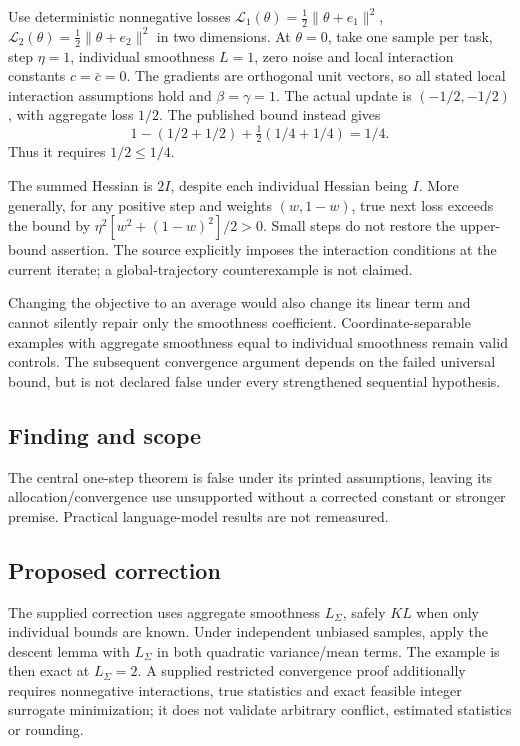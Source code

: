 \documentclass[11pt]{article}
\begin{document}
Use deterministic nonnegative losses \(\mathcal L_1(\theta)=\tfrac12\|\theta+e_1\|^2\), \(\mathcal L_2(\theta)=\tfrac12\|\theta+e_2\|^2\) in two dimensions. At \(\theta=0\), take one sample per task, step \(\eta=1\), individual smoothness \(L=1\), zero noise and local interaction constants \(c=\bar c=0\). The gradients are orthogonal unit vectors, so all stated local interaction assumptions hold and \(\beta=\gamma=1\). The actual update is \((-1/2,-1/2)\), with aggregate loss \(1/2\). The published bound instead gives \[1-(1/2+1/2)+\tfrac12(1/4+1/4)=1/4.\] Thus it requires \(1/2\leq1/4\).

The summed Hessian is \(2I\), despite each individual Hessian being \(I\). More generally, for any positive step and weights \((w,1-w)\), true next loss exceeds the bound by \(\eta^2[w^2+(1-w)^2]/2>0\). Small steps do not restore the upper-bound assertion. The source explicitly imposes the interaction conditions at the current iterate; a global-trajectory counterexample is not claimed.

Changing the objective to an average would also change its linear term and cannot silently repair only the smoothness coefficient. Coordinate-separable examples with aggregate smoothness equal to individual smoothness remain valid controls. The subsequent convergence argument depends on the failed universal bound, but is not declared false under every strengthened sequential hypothesis.

\subsection*{Finding and scope}

The central one-step theorem is false under its printed assumptions, leaving its allocation/convergence use unsupported without a corrected constant or stronger premise. Practical language-model results are not remeasured.

\subsection*{Proposed correction}

The supplied correction uses aggregate smoothness \(L_\Sigma\), safely \(KL\) when only individual bounds are known. Under independent unbiased samples, apply the descent lemma with \(L_\Sigma\) in both quadratic variance/mean terms. The example is then exact at \(L_\Sigma=2\). A supplied restricted convergence proof additionally requires nonnegative interactions, true statistics and exact feasible integer surrogate minimization; it does not validate arbitrary conflict, estimated statistics or rounding.
\end{document}
